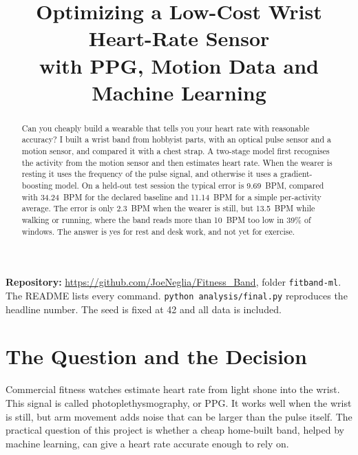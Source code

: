 \documentclass[conference]{IEEEtran}
\begin{document}
\title{Optimizing a Low-Cost Wrist Heart-Rate Sensor\\
with PPG, Motion Data and Machine Learning}

\author{
}

\maketitle

\begin{abstract}
Can you cheaply build a wearable that tells you your heart rate with reasonable accuracy? I built a wrist band from hobbyist parts, with an optical pulse sensor and a motion sensor, and compared it with a chest strap. A two-stage model first recognises the activity from the motion sensor and then estimates heart rate. When the wearer is resting it uses the frequency of the pulse signal, and otherwise it uses a gradient-boosting model. On a held-out test session the typical error is 9.69~BPM, compared with 34.24~BPM for the declared baseline and 11.14~BPM for a simple per-activity average. The error is only 2.3~BPM when the wearer is still, but 13.5~BPM while walking or running, where the band reads more than 10~BPM too low in 39\% of windows. The answer is yes for rest and desk work, and not yet for exercise.
\end{abstract}

{\raggedright\noindent\textbf{Repository:} \url{https://github.com/JoeNeglia/Fitness_Band}, folder \texttt{fitband-ml}. The README lists every command. \texttt{python analysis/final.py} reproduces the headline number. The seed is fixed at 42 and all data is included.\par}

\section{The Question and the Decision}
Commercial fitness watches estimate heart rate from light shone into the wrist. This signal is called photoplethysmography, or PPG. It works well when the wrist is still, but arm movement adds noise that can be larger than the pulse itself. The practical question of this project is whether a cheap home-built band, helped by machine learning, can give a heart rate accurate enough to rely on.
\end{document}
